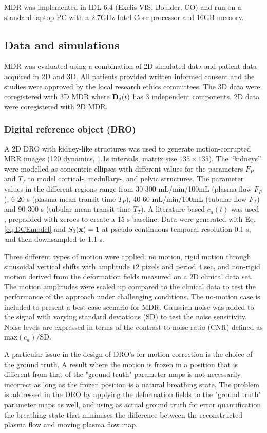 \documentclass[num-refs]{wiley-article}
\newcommand{\x}{{\bf x}}
\newcommand{\D}{{\bf D}}
\newcommand{\ca}{c_a}
\begin{document}
MDR was implemented in IDL 6.4 (Exelis VIS, Boulder, CO) and run on a standard laptop PC with a 2.7GHz Intel Core processor and 16GB memory. 

\subsection{Data and simulations}

MDR was evaluated using a combination of 2D simulated data and patient data acquired in 2D and 3D. All patients provided written informed consent and the studies were approved by the local research ethics committees. The 3D data were coregistered with 3D MDR where $\D_j(t)$ has 3 independent components. 2D data were coregistered with 2D MDR.

\subsubsection{Digital reference object (DRO)}

A 2D DRO with kidney-like structures was used to generate motion-corrupted MRR images (120 dynamics, 1.1s intervals, matrix size $135\times135$). The ``kidneys'' were modelled as concentric ellipses with different values for the parameters $F_P$ and $T_T$ to model cortical-, medullary-, and pelvic structures. The parameter values in the different regions range from 30-300 mL/min/100mL (plasma flow $F_P$), 6-20 s (plasma mean transit time $T_P$), 40-60 mL/min/100mL (tubular flow $F_T$) and 90-300 s (tubular mean transit time $T_T$). A literature based $\ca(t)$ was used \cite{Parker2006}, prepadded with zeroes to create a 15 s baseline. Data were generated with Eq. \ref{eq:DCEmodel} and $S_0(\x)=1$ at pseudo-continuous temporal resolution 0.1 s, and then downsampled to 1.1 s. 

Three different types of motion were applied: no motion, rigid motion through sinusoidal vertical shifts with amplitude $12$ pixels and period $4$ sec, and non-rigid motion derived from the deformation fields measured on a 2D clinical data set. The motion amplitudes were scaled up compared to the clinical data to test the performance of the approach under challenging conditions. The no-motion case is included to present a best-case scenario for MDR. Gaussian noise was added to the signal with varying standard deviations (SD) to test the noise sensitivity. Noise levels are expressed in terms of the contrast-to-noise ratio (CNR) defined as $\text{max}(\ca)/\text{SD}$. 

A particular issue in the design of DRO's for motion correction is the choice of the ground truth. A result where the motion is frozen in a position that is different from that of the "ground truth" parameter maps is not necessarily incorrect as long as the frozen position is a natural breathing state. The problem is addressed in the DRO by applying the deformation fields to the "ground truth" parameter maps as well, and using as actual ground truth for error quantification the breathing state that minimises the difference between the reconstructed plasma flow and moving plasma flow map.
\end{document}
